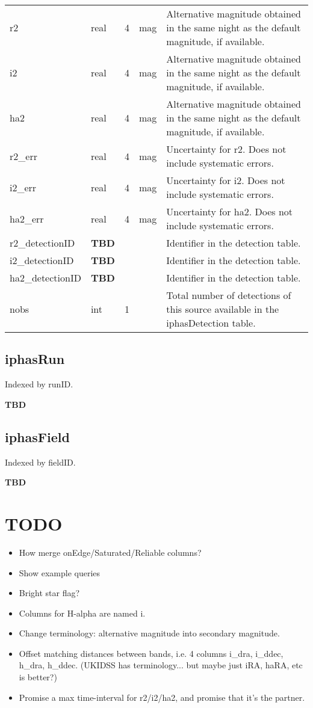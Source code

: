 \documentclass[12pt]{article}
\newcommand{\tbd}{{\tiny \textbf{TBD}}}
\begin{document}
\begin{center}
\begin{longtable}{llclp{9cm}}
r2 & real & 4 & mag & Alternative magnitude obtained in the same night as the default magnitude, if available. \\ 
i2 & real & 4 & mag & Alternative magnitude obtained in the same night as the default magnitude, if available. \\
ha2 & real & 4 & mag & Alternative magnitude obtained in the same night as the default magnitude, if available. \\ 
r2\_err & real & 4 & mag & Uncertainty for r2. Does not include systematic errors. \\ 
i2\_err & real & 4 & mag & Uncertainty for i2. Does not include systematic errors. \\
ha2\_err & real & 4 & mag & Uncertainty for ha2. Does not include systematic errors. \\ 
r2\_detectionID & \tbd & & & Identifier in the detection table. \\
i2\_detectionID & \tbd &  & & Identifier in the detection table. \\
ha2\_detectionID & \tbd & & & Identifier in the detection table. \\
nobs & int & 1 & & Total number of detections of this source available in the iphasDetection table. 
\\

\end{longtable}
\end{center}



\subsection{iphasRun}

Indexed by runID.

\tbd

\subsection{iphasField}

Indexed by fieldID.

\tbd

\section{TODO}
\begin{itemize}
\item How merge onEdge/Saturated/Reliable columns?
\item Show example queries
\item Bright star flag?
\item Columns for H-alpha are named i.
\item Change terminology: alternative magnitude into secondary magnitude.
\item Offset matching distances between bands, i.e. 4 columns i_dra, i_ddec, 
h_dra, h_ddec.  (UKIDSS has terminology... but maybe just iRA, haRA, etc is 
better?)
\item Promise a max time-interval for r2/i2/ha2, and promise that it's the 
partner.
\end{itemize}
\end{document}
